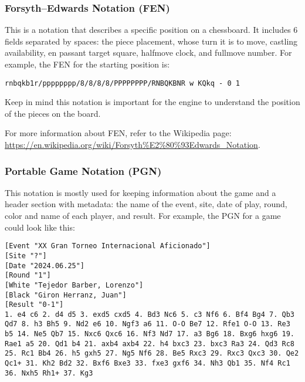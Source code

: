\subsubsection{Forsyth–Edwards Notation (FEN)}

This is a notation that describes a specific position on a chessboard. It includes 6 fields separated by spaces: the piece placement, whose turn it is to move, castling availability, en passant target square, halfmove clock, and fullmove number.
For example, the FEN for the starting position is:
\begin{verbatim}
rnbqkb1r/pppppppp/8/8/8/8/PPPPPPPP/RNBQKBNR w KQkq - 0 1
\end{verbatim}

\vspace{1em}

\noindent Keep in mind this notation is important for the engine to understand the position of the pieces on the board.

\vspace{1em}

\noindent For more information about FEN, refer to the Wikipedia page: \url{https://en.wikipedia.org/wiki/Forsyth%E2%80%93Edwards_Notation}.

\subsubsection{Portable Game Notation (PGN)}

This notation is mostly used for keeping information about the game and a header section with metadata: the name of the event, site, date of play, round, color and name of each player, and result. For example, the PGN for a game could look like this:

\begin{lstlisting}[basicstyle=\ttfamily\small, breaklines=true, frame=single, caption={Example of a PGN file}, label={lst:pgn-example}]
[Event "XX Gran Torneo Internacional Aficionado"]
[Site "?"]
[Date "2024.06.25"]
[Round "1"]
[White "Tejedor Barber, Lorenzo"]
[Black "Giron Herranz, Juan"]
[Result "0-1"]
1. e4 c6 2. d4 d5 3. exd5 cxd5 4. Bd3 Nc6 5. c3 Nf6 6. Bf4 Bg4 7. Qb3 Qd7 8. h3 Bh5 9. Nd2 e6 10. Ngf3 a6 11. O-O Be7 12. Rfe1 O-O 13. Re3 b5 14. Ne5 Qb7 15. Nxc6 Qxc6 16. Nf3 Nd7 17. a3 Bg6 18. Bxg6 hxg6 19. Rae1 a5 20. Qd1 b4 21. axb4 axb4 22. h4 bxc3 23. bxc3 Ra3 24. Qd3 Rc8 25. Rc1 Bb4 26. h5 gxh5 27. Ng5 Nf6 28. Be5 Rxc3 29. Rxc3 Qxc3 30. Qe2 Qc1+ 31. Kh2 Bd2 32. Bxf6 Bxe3 33. fxe3 gxf6 34. Nh3 Qb1 35. Nf4 Rc1 36. Nxh5 Rh1+ 37. Kg3
\end{lstlisting}

